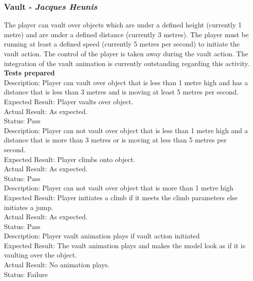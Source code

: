 \documentclass[a4paper,10pt]{article}
\begin{document}
\subsubsection{Vault - \textit{Jacques Heunis}}
The player can vault over objects which are under a defined height (currently 1 metre) and are under a defined distance (currently 3 metres). The player must be running at least a defined speed (currently 5 metres per second) to initiate the vault action. The control of the player is taken away during the vault action. The integration of the vault animation is currently outstanding regarding this activity.
\smallskip\\\textbf{Tests prepared}\\
Description: Player can vault over object that is less than 1 metre high and has a distance that is less than 3 metres and is moving at least 5 metres per second. \\
Expected Result: Player vaults over object.\\
Actual Result:  As expected.\\
Status: Pass
\smallskip\\
Description: Player can not vault over object that is less than 1 metre high and a distance that is more than 3 metres or is moving at less than 5 metres per second. \\
Expected Result: Player climbs onto object.\\
Actual Result:  As expected.\\
Status: Pass
\smallskip\\
Description: Player can not vault over object that is more than 1 metre high\\
Expected Result: Player initiates a climb if it meets the climb parameters else initiates a jump.\\
Actual Result: As expected.\\
Status: Pass
\smallskip\\
Description: Player vault animation plays if vault action initiated\\
Expected Result: The vault animation plays and makes the model look as if it is vaulting over the object.\\
Actual Result:  No animation plays.\\
Status: Failure
\end{document}
